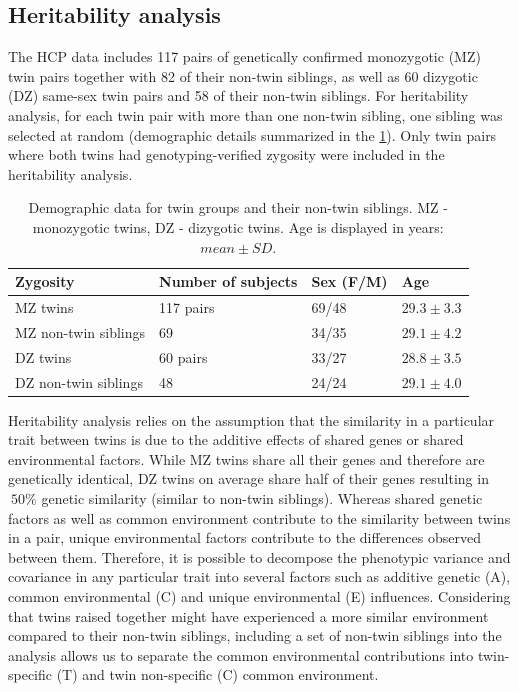 \subsection{Heritability analysis} 
\label{sec:Heritability}

The HCP data includes 117 pairs of genetically confirmed monozygotic (MZ) twin pairs together with 82 of their non-twin siblings, as well as 60 dizygotic (DZ) same-sex twin pairs and 58 of their non-twin siblings. For heritability analysis, for each twin pair with more than one non-twin sibling, one sibling was selected at random (demographic details summarized in the \ref{Ch5Table1}). Only twin pairs where both twins had genotyping-verified zygosity were included in the heritability analysis. 

\begin{table}[h!]
\centering
\caption{Demographic data for twin groups and their non-twin siblings. MZ - monozygotic twins, DZ - dizygotic twins. Age is displayed in years: $mean \pm SD$.}
\label{Ch5Table1}
\begin{tabular}{@{}llll@{}}
\toprule
\textbf{Zygosity} & \textbf{Number of subjects} & \textbf{Sex (F/M)} & \textbf{Age} \\ \midrule
MZ twins & 117 pairs & 69/48 & $29.3 \pm 3.3$ \\
MZ non-twin siblings & 69 & 34/35 & $29.1 \pm 4.2$ \\
DZ twins & 60 pairs & 33/27 & $28.8 \pm 3.5$ \\
DZ non-twin siblings & 48 & 24/24 & $29.1 \pm 4.0$ \\ \bottomrule
\end{tabular}
\end{table}

Heritability analysis relies on the assumption that the similarity in a particular trait between twins is due to the additive effects of shared genes or shared environmental factors. While MZ twins share all their genes and therefore are genetically identical, DZ twins on average share half of their genes resulting in $~50\%$ genetic similarity (similar to non-twin siblings). Whereas shared genetic factors as well as common environment contribute to the similarity between twins in a pair, unique environmental factors contribute to the differences observed between them. Therefore, it is possible to decompose the phenotypic variance and covariance in any particular trait into several factors such as additive genetic (A), common environmental (C) and unique environmental (E) influences. Considering that twins raised together might have experienced a more similar environment compared to their non-twin siblings, including a set of non-twin siblings into the analysis allows us to separate the common environmental contributions into twin-specific (T) and twin non-specific (C) common environment. 


